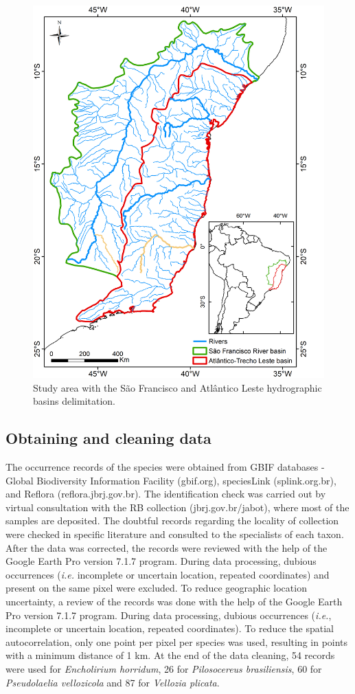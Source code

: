 \begin{figure}
  \centering
  \includegraphics[width=90 mm]{figs/bacias.png} 
  \caption{Study area  with the São Francisco and Atlântico Leste hydrographic basins delimitation.}
 \label{bacias}
\end{figure}

\subsection{Obtaining and cleaning data}

The occurrence records of the species were obtained from GBIF databases - Global Biodiversity Information Facility (gbif.org), speciesLink (splink.org.br), and Reflora (reflora.jbrj.gov.br). The identification check was carried out by virtual consultation with the RB collection (jbrj.gov.br/jabot), where most of the samples are deposited. The doubtful records regarding the locality of collection were checked in specific literature and consulted to the specialists of each taxon. After the data was corrected, the records were reviewed with the help of the Google Earth Pro version 7.1.7 program. During data processing, dubious occurrences (\textit{i.e.} incomplete or uncertain location, repeated coordinates) and present on the same pixel were excluded. To reduce geographic location uncertainty, a review of the records was done with the help of the Google Earth Pro version 7.1.7 program. During data processing, dubious occurrences (\textit{i.e.}, incomplete or uncertain location, repeated coordinates). To reduce the spatial autocorrelation, only one point per pixel per species was used, resulting in points with a minimum distance of 1 km. At the end of the data cleaning, 54 records were used for \textit{Encholirium horridum}, 26 for \textit{Pilosocereus brasiliensis}, 60 for \textit{Pseudolaelia vellozicola} and 87 for \textit{Vellozia plicata}.

